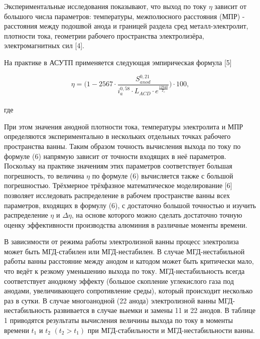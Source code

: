 \documentclass{article}
\begin{document}
Экспериментальные исследования показывают, что выход по току $\eta$ зависит от большого числа параметров: температуры, межполюсного расстояния (МПР) - расстояния между подошвой анода и границей раздела сред металл-электролит, плотности тока, геометрии рабочего пространства электролизёра, электромагнитных сил [4].

На практике в АСУТП применяется следующая эмпирическая формула [5] 

\[ \eta = \bigg(1-2567 \cdot \frac{S^{0,21}_{anod}}{i^{0,58}_{a}\cdot L_{ACD} \cdot e^{\frac{12940}{T_e}}}\bigg) \cdot 100, \]
\\
где 

При этом значения анодной плотности тока, температуры электролита и МПР определяются экспериментально в нескольких отдельных точках рабочего пространства ванны.
Таким образом точность вычисления выхода по току по формуле (6) напрямую зависит от точности входящих в неё параметров. Поскольку на практике значениям этих параметров соответствует большая погрешность, то величина $\eta$ по формуле (6) вычисляется также с большой погрешностью. Трёхмерное трёхфазное математическое моделирование [6] позволяет исследовать распределение в рабочем пространстве ванны всех параметров, входящих в формулу (6), с достаточно большой точностью и изучить распределение $\eta$ и $\Delta\eta$, на основе которого можно сделать достаточно точную оценку эффективности производства алюминия в различные моменты времени.

В зависимости от режима работы электролизной ванны процесс электролиза может быть МГД-стабилен или МГД-нестабилен. В случае МГД-нестабильной работы ванны расстояние между анодом и катодом может быть критически мало, что ведёт к резкому уменьшению выхода по току. МГД-нестабильность всегда соответствует анодному эффекту (большое скопление углекислого газа под анодами, увеличивающего сопротивление среды), который происходит несколько раз в сутки. В случае многоанодной (22 анода) электролизной ванны МГД-нестабильность развивается в случае выемки и замены 11 и 22 анодов. В таблице 1 приводятся результаты вычисления величины выхода по току в моменты времени $t_1$ и $t_2$ $(t_2>t_1)$ при МГД-стабильности и МГД-нестабильности ванны. 
\end{document}
